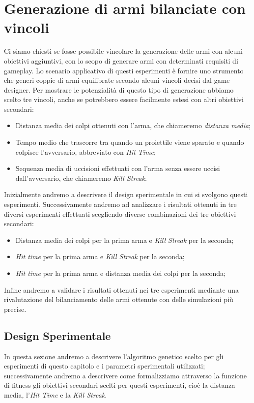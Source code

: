 \documentclass[12pt, italian]{toptesi}
\begin{document}
\chapter{Generazione di armi bilanciate con vincoli}
Ci siamo chiesti se fosse possibile vincolare la generazione delle armi con alcuni obiettivi aggiuntivi, con lo scopo di generare armi con determinati requisiti di gameplay.
Lo scenario applicativo di questi esperimenti è fornire uno strumento che generi coppie di armi equilibrate secondo alcuni vincoli decisi dal game designer.
Per mostrare le potenzialità di questo tipo di generazione abbiamo scelto tre vincoli, anche se potrebbero essere facilmente estesi con altri obiettivi secondari:
\begin{itemize}
\item Distanza media dei colpi ottenuti con l'arma, che chiameremo \emph{distanza media};
\item Tempo medio che trascorre tra quando un proiettile viene sparato e quando colpisce l'avversario, abbreviato con \emph{Hit Time};
\item Sequenza media di uccisioni effettuati con l'arma senza essere uccisi dall'avversario, che chiameremo \emph{Kill Streak}.
\end{itemize}

Inizialmente andremo a descrivere il design sperimentale in cui si svolgono questi esperimenti.
Successivamente andremo ad analizzare i risultati ottenuti in tre diversi esperimenti effettuati scegliendo diverse combinazioni dei tre obiettivi secondari:
\begin{itemize}
\item Distanza media dei colpi per la prima arma e \emph{Kill Streak} per la seconda;
\item \emph{Hit time} per la prima arma e \emph{Kill Streak} per la seconda;
\item \emph{Hit time} per la prima arma e distanza media dei colpi per la seconda;
\end{itemize}
Infine andremo a validare i risultati ottenuti nei tre esperimenti mediante una rivalutazione del bilanciamento delle armi ottenute con delle simulazioni più precise.

\section{Design Sperimentale}
In questa sezione andremo a descrivere l'algoritmo genetico scelto per gli esperimenti di questo capitolo e i parametri sperimentali utilizzati; successivamente andremo a descrivere come formalizziamo attraverso la funzione di fitness gli obiettivi secondari scelti per questi esperimenti, cioè la distanza media, l'\emph{Hit Time} e la \emph{Kill Streak}.
\end{document}
